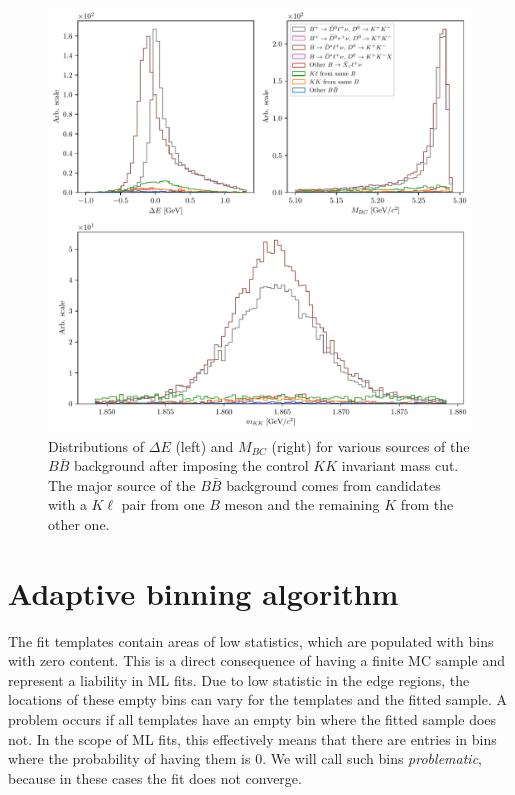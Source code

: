 \begin{figure}[H]
	\centering
	\captionsetup{width=0.8\linewidth}
	\includegraphics[width=\linewidth]{fig/cs_BKG_composition}
	\caption{Distributions of $\Delta E$ (left) and $M_{BC}$ (right) for various sources of the $B \bar B$ background after imposing the control $KK$ invariant mass cut. The major source of the $B \bar B$ background comes from candidates with a $K\ell$ pair from one $B$ meson and the remaining $K$ from the other one.}
	\label{fig:cs_BKG_comp}
\end{figure}

\section{Adaptive binning algorithm}\label{sec:adaptive-binning-algorithm}

The fit templates contain areas of low statistics, which are populated with bins with zero content. This is a direct consequence of having a finite MC sample and represent a liability in ML fits. Due to low statistic in the edge regions, the locations of these empty bins can vary for the templates and the fitted sample. A problem occurs if all templates have an empty bin where the fitted sample does not. In the scope of ML fits, this effectively means that there are entries in bins where the probability of having them is $0$. We will call such bins \textit{problematic}, because in these cases the fit does not converge.

